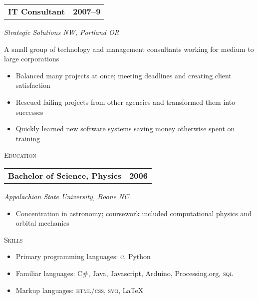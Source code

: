 \documentclass[letterpaper,10pt]{article}
\makeatletter
\newcommand{\resumeheader}[1]{
  \vspace{0.08in}
  \textsc{\Large #1}
  \vspace{0.10in}
}
\newcommand{\resumeitem}[4]{
  {\addtolength{\leftskip}{0.21in}
    \begin{tabular*}{6.25in}{l@{\extracolsep{\fill}} r}
      {\textbf{#1}} & {\textbf{#2}} \\
    \end{tabular*}
    
  }
  
  \vspace{0.01in}
  {\addtolength{\leftskip}{0.3in}
    \textit{#3}\par
  }
  
  \vspace{0.07in}
  {\addtolength{\leftskip}{0.3in}
    \small
    \begin{minipage}{5in}
      #4
    \end{minipage}
    
  }
  \vspace{0.15in}
}
\makeatother
\begin{document}
\resumeitem{IT Consultant}{2007--9}%
           {Strategic Solutions NW, Portland OR}%
           {
              A small group of technology and management consultants working for medium to large corporations
              \begin{itemize}[topsep=1pt, itemsep=0pt, parsep=0pt]
                \renewcommand{\labelitemi}{---}
                \item Balanced many projects at once; meeting deadlines and creating client satisfaction
                \item Rescued failing projects from other agencies and transformed them into successes
                \item Quickly learned new software systems saving money otherwise spent on training
              \end{itemize}
           }

\resumeheader{Education}

\resumeitem{Bachelor of Science, Physics} {2006}%
           {Appalachian State University, Boone NC}%
           {
              \begin{itemize}[topsep=1pt, itemsep=0pt, parsep=0pt]
                \renewcommand{\labelitemi}{---}
                \item Concentration in astronomy; coursework included computational physics and orbital mechanics
              \end{itemize}
           }
           
\resumeheader{Skills} 

\begin{itemize}[topsep=1pt, itemsep=0pt, parsep=0pt]
  \renewcommand{\labelitemi}{---}
  \item Primary programming languages: \textsc{c}, Python
  \item Familiar languages: C\#, Java, Javascript, Arduino, Processing.org, \textsc{sql}
  \item Markup languages: \textsc{html}/\textsc{css}, \textsc{svg}, \LaTeX
\end{itemize}
\end{document}

